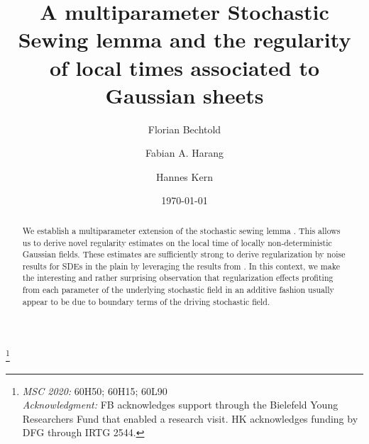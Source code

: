 \documentclass[11pt,oneside,english,reqno]{amsart}
\numberwithin{equation}{section}
\numberwithin{figure}{section}
\theoremstyle{plain}
\theoremstyle{definition}
\theoremstyle{remark}
\theoremstyle{plain}
\theoremstyle{plain}
\theoremstyle{plain}
\theoremstyle{plain}
\theoremstyle{plain}
\begin{document}
\title[]{A multiparameter Stochastic Sewing lemma and the regularity of local times associated to Gaussian sheets}
\author{Florian Bechtold \and Fabian A. Harang \and Hannes Kern}
\date{\today}

\address{Florian Bechtold: Fakult\"at f\"ur Mathematik,
Universit\"at Bielefeld, 33501 Bielefeld, Germany}

\address{Fabian A. Harang: Department of Economics, BI Norwegian Business School, Handelshøyskolen BI, 0442, Oslo, Norway.}

\address{Hannes Kern: Departement II, TU Berlin, 10623 Berlin, Germany.}


\thanks{ \emph{MSC 2020:} 60H50; 60H15; 60L90
\\
\emph{Acknowledgment:} FB acknowledges support through the Bielefeld Young Researchers Fund that enabled a research visit. HK acknowledges funding by DFG through IRTG 2544.}


\keywords{}

\begin{abstract}
We establish a multiparameter extension of the stochastic sewing lemma \cite{stochasticsewing}. This allows us to derive novel regularity estimates on the local time of locally non-deterministic Gaussian fields. These estimates are sufficiently strong to derive regularization by noise results for SDEs in the plain by leveraging the results from \cite{Bechtold2023}. In this context, we make the interesting and rather surprising observation that regularization effects profiting from each parameter of the underlying stochastic field in an additive fashion usually appear to be due to boundary terms of the driving stochastic field.
\end{abstract}

\maketitle

\tableofcontents{}
\end{document}
